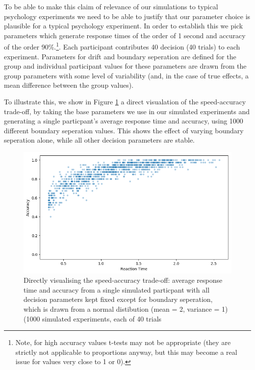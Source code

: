 \documentclass[floatsintext,doc]{apa6}
\theoremstyle{definition}
\theoremstyle{definition}
\theoremstyle{definition}
\theoremstyle{remark}
\begin{document}
To be able to make this claim of relevance of our simulations to typical
psychology experiments we need to be able to justify that our parameter
choice is plausible for a typical psychology experiment. In order to
establish this we pick parameters which generate response times of the
order of 1 second and accuracy of the order 90\%.\footnote{Note, for
  high accuracy values t-tests may not be appropriate (they are strictly
  not applicable to proportions anyway, but this may become a real issue
  for values very close to 1 or 0).}. Each participant contributes 40
decision (40 trials) to each experiment. Parameters for drift and
boundary seperation are defined for the group and individual participant
values for these parameters are drawn from the group parameters with
some level of variability (and, in the case of true effects, a mean
difference between the group values).

To illustrate this, we show in Figure \ref{fig:SATOdirect} a direct
visualation of the speed-accuracy trade-off, by taking the base
parameters we use in our simulated experiments and generating a single
particpant's average response time and accuracy, using 1000 different
boundary seperation values. This shows the effect of varying boundary
seperation alone, while all other decision parameters are stable.

\begin{figure}
\centering
\includegraphics{figs/SATO-direct_scatter.png}
\caption{\label{fig:SATOdirect}Directly visualising the speed-accuracy
trade-off: average response time and accuracy from a single simulated
particpant with all decision parameters kept fixed except for boundary
seperation, which is drawn from a normal distibution (mean = 2, variance
= 1) (1000 simulated experiments, each of 40 trials}
\end{figure}
\end{document}

